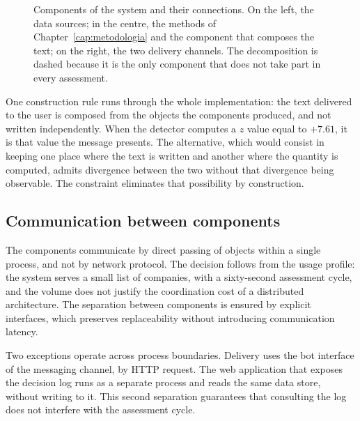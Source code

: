 \begin{figure}[htbp]
\caption[Architecture of InvestiGator]{Components of the system and their connections. On the
left, the data sources; in the centre, the methods of Chapter~\ref{cap:metodologia} and the
component that composes the text; on the right, the two delivery channels. The decomposition is
dashed because it is the only component that does not take part in every assessment.}
\label{fig:sis_arquitetura}
\end{figure}

One construction rule runs through the whole implementation: the text delivered to the user is
composed from the objects the components produced, and not written independently. When the detector
computes a $z$ value equal to $+7.61$, it is that value the message presents. The alternative,
which would consist in keeping one place where the text is written and another where the quantity
is computed, admits divergence between the two without that divergence being observable. The
constraint eliminates that possibility by construction.

\subsection{Communication between components}

The components communicate by direct passing of objects within a single process, and not by
network protocol. The decision follows from the usage profile: the system serves a small list of
companies, with a sixty-second assessment cycle, and the volume does not justify the coordination
cost of a distributed architecture. The separation between components is ensured by explicit
interfaces, which preserves replaceability without introducing communication latency.

Two exceptions operate across process boundaries. Delivery uses the bot interface of the messaging
channel, by \gls{HTTP} request. The web application that exposes the decision log runs as a
separate process and reads the same data store, without writing to it. This second separation
guarantees that consulting the log does not interfere with the assessment cycle.

